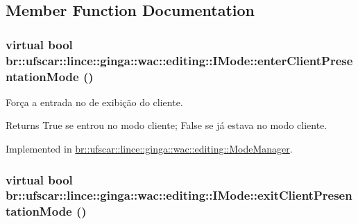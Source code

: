\subsection{Member Function Documentation}
\hypertarget{classbr_1_1ufscar_1_1lince_1_1ginga_1_1wac_1_1editing_1_1IMode_ab6b8c4de92a5f940f8c726f327f9aa55}{
\subsubsection[{enterClientPresentationMode}]{\setlength{\rightskip}{0pt plus 5cm}virtual bool br::ufscar::lince::ginga::wac::editing::IMode::enterClientPresentationMode ()}}
\label{classbr_1_1ufscar_1_1lince_1_1ginga_1_1wac_1_1editing_1_1IMode_ab6b8c4de92a5f940f8c726f327f9aa55}


Força a entrada no de exibição do cliente. 

\begin{DoxyReturn}{Returns}
True se entrou no modo cliente; False se já estava no modo cliente. 
\end{DoxyReturn}


Implemented in \hyperlink{classbr_1_1ufscar_1_1lince_1_1ginga_1_1wac_1_1editing_1_1ModeManager_a5f62cca336317833ac6565a0acc779e6}{br::ufscar::lince::ginga::wac::editing::ModeManager}.

\hypertarget{classbr_1_1ufscar_1_1lince_1_1ginga_1_1wac_1_1editing_1_1IMode_a36555fd659519e30880b9d3f4644d257}{
\subsubsection[{exitClientPresentationMode}]{\setlength{\rightskip}{0pt plus 5cm}virtual bool br::ufscar::lince::ginga::wac::editing::IMode::exitClientPresentationMode ()}}
\label{classbr_1_1ufscar_1_1lince_1_1ginga_1_1wac_1_1editing_1_1IMode_a36555fd659519e30880b9d3f4644d257}



